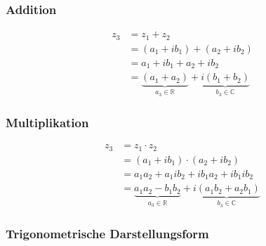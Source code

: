 \subsubsection{Addition}


\begin{align*}
	z_3 & = z_1 + z_2                                       \\
	    & = (a_1 + i b_1) + (a_2 + i b_2)                   \\
	    & = a_1 + i b_1 + a_2 + i b_2                       \\
	    & = \underbrace{(a_1 + a_2)}_{a_3 \in \mathbb{R}} +
	\underbrace{i(b_1 + b_2)}_{b_3 \in \mathbb{C}}
\end{align*}

\subsubsection{Multiplikation}

\begin{align*}
	z_3 & = z_1 \cdot z_2                                         \\
	    & = (a_1 + i b_1) \cdot (a_2 + i b_2)                     \\
	    & = a_1 a_2 + a_1 ib_2 + ib_1 a_2 + ib_1 ib_2             \\
	    & = \underbrace{a_1 a_2 - b_1 b_2}_{a_3 \in \mathbb{R}} +
	\underbrace{i(a_1 b_2 + a_2 b_1)}_{b_3 \in \mathbb{C}}
\end{align*}


\subsubsection{Trigonometrische Darstellungsform}

